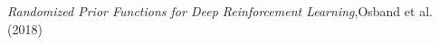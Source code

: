 \documentclass[preview]{standalone}
\begin{document}
\begin{center}
\textit{Randomized Prior Functions for Deep Reinforcement Learning},\n Osband et al. (2018)
\end{center}
\end{document}

